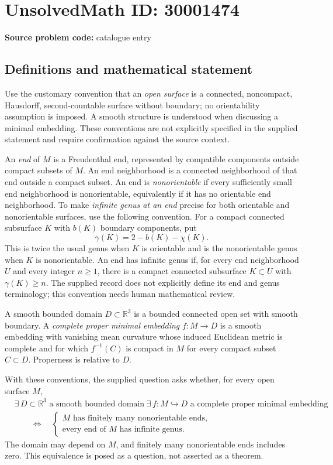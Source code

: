 \documentclass[11pt]{article}
\newcommand{\R}{\mathbb{R}}
\begin{document}
\section*{UnsolvedMath ID: 30001474}
\textbf{Source problem code:} catalogue entry
\subsection{Definitions and mathematical statement}
Use the customary convention that an \emph{open surface} is a connected, noncompact, Hausdorff, second-countable surface without boundary; no orientability assumption is imposed. A smooth structure is understood when discussing a minimal embedding. These conventions are not explicitly specified in the supplied statement and require confirmation against the source context.

An \emph{end} of \(M\) is a Freudenthal end, represented by compatible components outside compact subsets of \(M\). An end neighborhood is a connected neighborhood of that end outside a compact subset. An end is \emph{nonorientable} if every sufficiently small end neighborhood is nonorientable, equivalently if it has no orientable end neighborhood. To make \emph{infinite genus at an end} precise for both orientable and nonorientable surfaces, use the following convention. For a compact connected subsurface \(K\) with \(b(K)\) boundary components, put
\[
\gamma(K)=2-b(K)-\chi(K).
\]
This is twice the usual genus when \(K\) is orientable and is the nonorientable genus when \(K\) is nonorientable. An end has infinite genus if, for every end neighborhood \(U\) and every integer \(n\geq 1\), there is a compact connected subsurface \(K\subset U\) with \(\gamma(K)\geq n\). The supplied record does not explicitly define its end and genus terminology; this convention needs human mathematical review.

A smooth bounded domain \(D\subset\R^3\) is a bounded connected open set with smooth boundary. A \emph{complete proper minimal embedding} \(f\colon M\to D\) is a smooth embedding with vanishing mean curvature whose induced Euclidean metric is complete and for which \(f^{-1}(C)\) is compact in \(M\) for every compact subset \(C\subset D\). Properness is relative to \(D\).

With these conventions, the supplied question asks whether, for every open surface \(M\),
\[
\begin{aligned}
&\exists\,D\subset\R^3\text{ a smooth bounded domain}\;
\exists\,f\colon M\hookrightarrow D
\text{ a complete proper minimal embedding}
\\[-1mm]
&\qquad\Longleftrightarrow\quad
\left\{
\begin{array}{l}
M\text{ has finitely many nonorientable ends},\\
\text{every end of }M\text{ has infinite genus}.
\end{array}
\right.
\end{aligned}
\]
The domain may depend on \(M\), and finitely many nonorientable ends includes zero. This equivalence is posed as a question, not asserted as a theorem.
\end{document}
